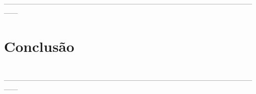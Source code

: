 \documentclass[12pt,twoside]{article}
\begin{document}
    \lipsum[2] \\
    ------------------------------------------------------------------------------------------------------------------
    
    \newpage
  
  \section{Conclusão}
    \lipsum[1] \\
    ------------------------------------------------------------------------------------------------------------------

    \newpage

  \thispagestyle{empty} %
\end{document}
